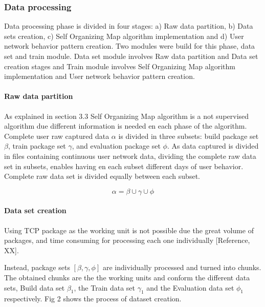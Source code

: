 \documentclass{article}
\begin{document}
\subsubsection{Data processing} %
Data processing phase is divided in four stages: a) Raw data partition, b) Data sets creation, c) Self Organizing Map algorithm implementation and d) User network behavior pattern creation. Two modules were build for this phase, data set and train module. Data set module involves Raw data partition and Data set creation stages and Train module involves Self Organizing Map algorithm implementation and User network behavior pattern creation.




\paragraph{Raw data partition} %
As explained in section 3.3 Self Organizing Map algorithm is a not supervised algorithm due different information is needed en each phase of the algorithm. Complete user raw captured data $\alpha$ is divided in three subsets: build package set $\beta$, train package set $\gamma$, and evaluation package set $\phi$. As data captured is divided in files containing continuous user network data, dividing the complete raw data set in subsets, enables having en each subset different days of user behavior. Complete raw data set is divided equally between each subset.

\begin{equation}
\alpha = \beta \cup \gamma \cup \phi
\end{equation}




\paragraph{Data set creation} %
Using TCP package as the working unit is not possible due the great volume of packages, and time consuming for processing each one individually [Reference, XX].

Instead, package sets $[\beta,\gamma,\phi]$ are individually processed and turned into chunks. The obtained chunks are the the working units and conform the different data sets, Build data set $\beta_1$, the Train data set $\gamma_1$ and the Evaluation data set $\phi_1$ respectively. Fig 2 shows the process of dataset creation.
\end{document}
